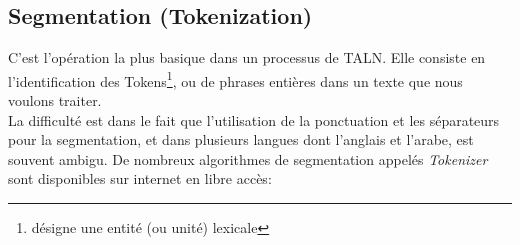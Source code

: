     \subsection{Segmentation (Tokenization)}
    C'est l'opération la plus basique dans un processus de TALN. Elle consiste en l'identification des Tokens\footnote{désigne une entité (ou unité) lexicale}, ou de phrases entières dans un texte que nous voulons traiter.\\La difficulté est dans le fait que l'utilisation de la ponctuation et les séparateurs pour la segmentation, et dans plusieurs langues dont l'anglais et l'arabe, est souvent ambigu.     
    De nombreux algorithmes de segmentation appelés \emph{Tokenizer} sont disponibles sur internet en libre accès:

